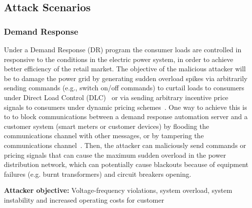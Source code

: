 \documentclass[conference]{IEEEtran}
\begin{document}
\subsection{Attack Scenarios} 
\subsubsection{Demand Response}
Under a Demand Response (DR) program the consumer loads are controlled in responsive to the conditions in the electric power system, in order to achieve better efficiency of the retail market. The objective of the malicious attacker will be to damage the power grid by generating sudden overload spikes via arbitrarily sending commands (e.g., switch on/off commands) to curtail loads to consumers under Direct Load Control (DLC)~\cite{Amini:ISGT2015} or via sending arbitrary incentive price signals to consumers under dynamic pricing schemes~\cite{Liu:DSC2016}. One way to achieve this is to to block communications between
a demand response automation server and a customer
system (smart meters or customer devices) by flooding
the communications channel with other messages, or by
tampering the communications channel~\cite{Lee:NESCOR2013}. Then, the
attacker can maliciously send commands or pricing signals that can cause the maximum sudden overload in the power distribution network, which can potentially cause blackouts because of equipment failures
(e.g. burnt transformers) and circuit breakers opening. 

\textbf{Attacker objective:} Voltage-frequency violations, system overload, system instability and increased operating costs for customer 
\end{document}
